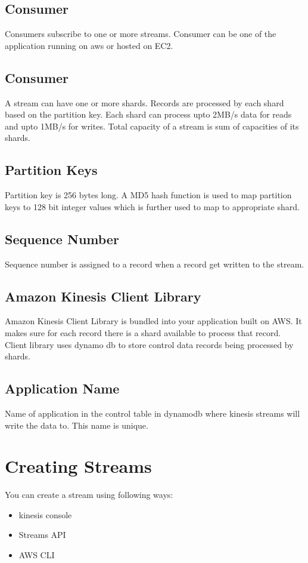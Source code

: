 \documentclass[9pt,twocolumn,twoside]{../../styles/osajnl}
\begin{document}
\subsection{Consumer}
 Consumers subscribe to one or more streams.  Consumer can be one of the application  running on aws or hosted on EC2.
 
\subsection{Consumer}
A stream can have one or more shards. Records are processed by each shard based on the partition key. Each shard can process upto 2MB/s data for reads and upto 1MB/s for writes. Total capacity of a stream is sum of capacities of its shards.

\subsection{Partition Keys} 
Partition key is 256 bytes long. A MD5 hash function is used to map partition keys to 128 bit integer values which is further used to map to appropriate shard.

\subsection{Sequence Number}
Sequence number is assigned to a record when a record get written to the stream. 

\subsection{Amazon Kinesis Client Library}
Amazon Kinesis Client Library is bundled into your application built on AWS. It makes sure for each record there is a shard available to process that record. Client library uses dynamo db to store control data records being processed by shards.

\subsection{Application Name}
Name of application in the control table in dynamodb where kinesis streams will write the data to. This name is unique.

\section{Creating Streams}

You can create a stream using following ways:
\begin{itemize}
	\item kinesis console
	\item Streams API
	\item AWS CLI
\end{itemize}
\end{document}
